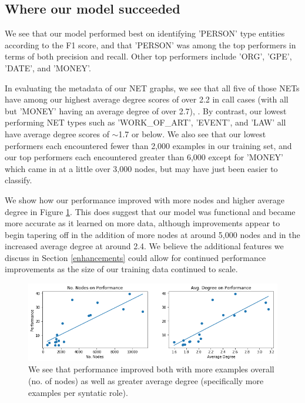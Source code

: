 \documentclass[11pt,a4paper]{article}
\begin{document}
\subsection{Where our model succeeded}

We see that our model performed best on identifying 'PERSON' type entities according to the F1 score, and that 'PERSON' was among the top performers in terms of both precision and recall. Other top performers include 'ORG', 'GPE', 'DATE', and 'MONEY'.

In evaluating the metadata of our NET graphs, we see that all five of those NETs have among our highest average degree scores of over 2.2 in call cases (with all but 'MONEY' having an average degree of over 2.7), . By contrast, our lowest performing NET types such as 'WORK\_OF\_ART', 'EVENT', and 'LAW' all have average degree scores of $\sim$1.7 or below. We also see that our lowest performers each encountered fewer than 2,000 examples in our training set, and our top performers each encountered greater than 6,000 except for 'MONEY' which came in at a little over 3,000 nodes, but may have just been easier to classify.

We show how our performance improved with more nodes and higher average degree in Figure \ref{fig:performance}. This does suggest that our model was functional and became more accurate as it learned on more data, although improvements appear to begin tapering off in the addition of more nodes at around 5,000 nodes and in the increased average degree at around 2.4. We believe the additional features we discuss in Section \ref{enhancements} could allow for continued performance improvements as the size of our training data continued to scale.

\begin{figure}[ht]
  \includegraphics[width=\textwidth]{figures/performance.png}
  \caption{We see that performance improved both with more examples overall (no. of nodes) as well as greater average degree (specifically more examples per syntatic role).}
  \label{fig:performance}
\end{figure}
\end{document}
